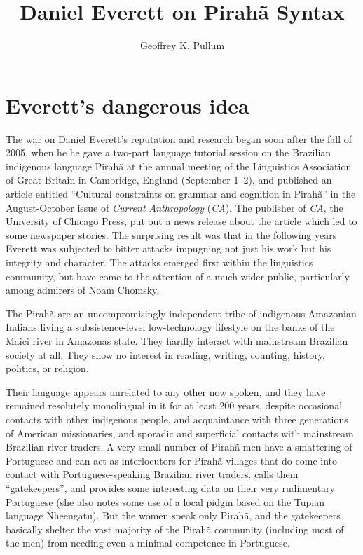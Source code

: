 \documentclass[output=paper,colorlinks,citecolor=brown
]{langscibook}
\author{Geoffrey K. Pullum\orcid{0000—0002—7748—8847}\affiliation{University of Edinburgh}}
\title{Daniel Everett on Pirah\~a Syntax}
\begin{document}
\maketitle
\label{chap-3_pullum}


\section{Everett's dangerous idea}\label{intro}

The war on Daniel Everett's reputation and research began soon after
the fall of 2005, when he he gave a two-part language tutorial session
on the Brazilian indigenous language Pirah{\~a} at the annual meeting
of the Linguistics Association of Great Britain in Cambridge, England
(September 1--2), and published an article entitled ``Cultural constraints
on grammar and cognition in Pirah{\~a}'' in the August-October issue of
\textit{Current Anthropology} (\textit{CA}). The publisher of \textit{CA},
the University of Chicago Press, put out a news release about the article
which led to some newspaper stories. The surprising result was that in
the following years Everett was subjected to bitter attacks impugning
not just his work but his integrity and character. The attacks emerged
first within the linguistics community, but have come to the attention
of a much wider public, particularly among admirers of Noam Chomsky.

The Pirah{\~a} are an uncompromisingly independent tribe of indigenous
Amazonian Indians living a subsistence-level low-technology lifestyle
on the banks of the Maici river in Amazonas state. They hardly interact
with mainstream Brazilian society at all. They show no interest in
reading, writing, counting, history, politics, or religion.

Their language appears unrelated to any other now spoken, and they
have remained resolutely monolingual in it for at least 200 years,
despite occasional contacts with other indigenous people, and
acquaintance with three generations of American missionaries, and
sporadic and superficial contacts with mainstream Brazilian river
traders. A very small number of Pirah{\~a} men have a smattering of
Portuguese and can act as interlocutors for Pirah{\~a} villages that
do come into contact with Portuguese-speaking Brazilian river traders.
\citet{Sakel12} calls them ``gatekeepers'', and provides some interesting
data on their very rudimentary Portuguese (she also notes some use
of a local pidgin based on the Tupian language Nheengatu). But the
women speak only Pirah{\~a}, and the gatekeepers basically shelter
the vast majority of the Pirah{\~a} community (including most of the
men) from needing even a minimal competence in Portuguese.
\end{document}

